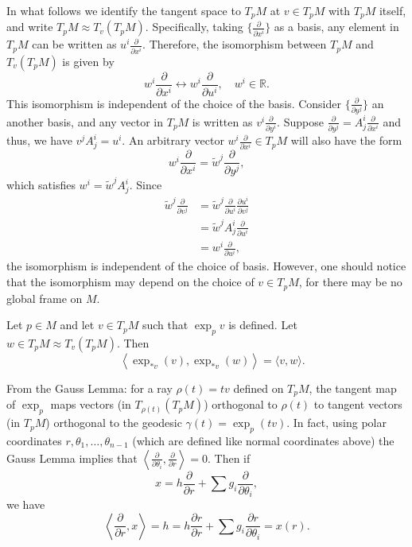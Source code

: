 \documentclass{ctexart}
\begin{document}
In what follows we identify the tangent space to $T_p M$ at $v \in T_p M$ with $T_p M$ itself, and write $T_p M \approx T_v\left(T_p M\right)$. 
Specifically, taking $\{\frac{\partial}{\partial x^i}\}$ as a basis, any element in $T_pM$ can be written as $u^i\frac{\partial}{\partial x^i}$. Therefore, 
the isomorphism between $T_pM$ and $T_v\left(T_pM\right)$ is given by 
$$
w^i\frac{\partial}{\partial x^i}\longleftrightarrow w^i\frac{\partial}{\partial u^i}, \quad w^i\in\mathbb{R}.
$$
This isomorphism is independent of the choice of the basis. Consider $\{\frac{\partial}{\partial y^j}\}$ an another basis, and any vector in $T_pM$ is written as 
$v^i\frac{\partial}{\partial y^i}$. Suppose $\frac{\partial}{\partial y^j}=A_j^i\frac{\partial}{\partial x^i}$ and thus, we have $v^jA_j^i=u^i$.
An arbitrary vector $w^i\frac{\partial}{\partial x^i}\in T_pM$ will also have the form
$$
w^i\frac{\partial}{\partial x^i}=\tilde{w}^j\frac{\partial}{\partial y^j},
$$
which satisfies $w^i=\tilde{w}^jA_j^i$.
Since 
\begin{align*}
  \tilde{w}^j\frac{\partial}{\partial v^j}
  &= \tilde{w}^j \frac{\partial}{\partial u^i} \frac{\partial u^i}{\partial v^j} \\
  &= \tilde{w}^j A_j^i \frac{\partial}{\partial u^i} \\
  &= w^i \frac{\partial}{\partial u^i},
\end{align*}
the isomorphism is independent of the choice of basis. However, one should notice that the isomorphism may depend on the choice of $v\in T_pM$, for 
there may be no global frame on $M$.

\begin{lemma}
    Let $p \in M$ and let $v \in T_p M$ such that $\exp _p v$ is defined. Let $w \in T_p M \approx T_v\left(T_p M\right)$. Then
    $$
    \quad\left\langle\exp_{*v}(v),\exp_{*v}(w)\right\rangle=\langle v, w\rangle.
    $$
\end{lemma}
From the Gauss Lemma: for a ray $\rho(t)=tv$ defined on $T_p M$, the tangent map of $\exp_p$ maps vectors (in $T_{\rho(t)}(T_p M)$) orthogonal to $\rho(t)$ 
to tangent vectors (in $T_p M$) orthogonal to the geodesic $\gamma(t) = \exp_p(tv)$.
In fact, using polar coordinates $r, \theta_1, \ldots, \theta_{n-1}$ (which are defined like normal coordinates above) the Gauss Lemma implies that 
$\left\langle\frac{\partial}{\partial \theta_i}, \frac{\partial}{\partial r}\right\rangle=0$. Then if
$$
x=h \frac{\partial}{\partial r}+\sum g_i \frac{\partial}{\partial \theta_i},
$$
we have
$$
\left\langle\frac{\partial}{\partial r}, x\right\rangle=h=h \frac{\partial r}{\partial r}+\sum g_i \frac{\partial r}{\partial \theta_i}=x(r) .
$$
\end{document}
